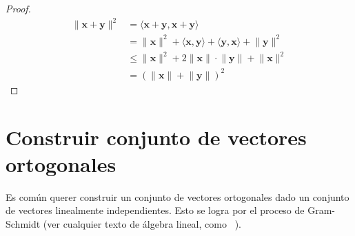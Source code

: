   \begin{proof}
    \begin{align*}
      \lVert \mathbf{x} + \mathbf{y} \rVert^2
        &=   \langle
               \mathbf{x} + \mathbf{y},
               \mathbf{x} + \mathbf{y}
             \rangle \\
        &=   \lVert \mathbf{x} \rVert^2
               + \langle \mathbf{x}, \mathbf{y} \rangle
               + \langle \mathbf{y}, \mathbf{x} \rangle
               + \lVert \mathbf{y} \rVert^2 \\
        &\le \lVert \mathbf{x} \rVert^2
               + 2 \lVert \mathbf{x} \rVert \cdot \lVert \mathbf{y} \rVert
               + \lVert \mathbf{x} \rVert^2 \\
        &= ( \lVert \mathbf{x} \rVert + \lVert \mathbf{y} \rVert )^2
    \end{align*}
    \qedhere
  \end{proof}

\section{Construir conjunto de vectores ortogonales}
\label{sec:construir-vectores-ortogonales}

  Es común querer construir un conjunto de vectores ortogonales
  dado un conjunto de vectores linealmente independientes.
  Esto se logra por el proceso de Gram-Schmidt
  (ver cualquier texto de álgebra lineal,
   como~%
     \cite{treil17:_linear_algeb_done_wrong}).

